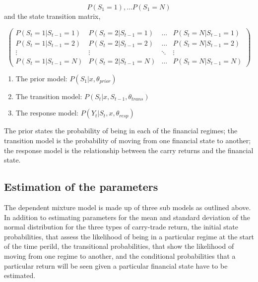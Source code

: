 \documentclass[12pt, a4paper, oneside]{article} %
\begin{document}
\begin{equation*}
P(S_1 = 1), \dots P(S_1 = N)
\end{equation*}
and the state transition matrix, 

\begin{equation*}
\begin{pmatrix}
P(S_t = 1|S_{t-1}=1) & P(S_t = 2|S_{t-1}=1) & \dots & P(S_t = N|S_{t-1}=1)\\
P(S_t = 1|S_{t-1}=2) & P(S_t = 2|S_{t-1}=2) & \dots & P(S_t = N|S_{t-1}=2)\\
\vdots & \vdots & \ddots & \vdots \\
P(S_t = 1|S_{t-1}=N) & P(S_t = 2|S_{t-1}=N) & \dots & P(S_t = N|S_{t-1}=N)
\end{pmatrix}
\end{equation*}

\begin{enumerate}
\item The prior model: $P(S_1|x, \theta_{prior})$
\item The transition model: $P(S_t|x, S_{t-1}, \theta_{trans})$
\item The response model: $P(Y_t| S_t, x, \theta_{resp})$
\end{enumerate}
 
The prior states the probability of being in each of the financial regimes; the transition model is the probability of moving from one financial state to another; the response model is the relationship between the carry returns and the financial state.  



\subsection{Estimation of the parameters}
The dependent mixture model is made up of three sub models as outlined above. 
In addition to estimating parameters for the mean and standard deviation  of the normal distribution for the three types of carry-trade return, the initial state probabilities, that assess the likelihood of being in a particular regime at the start of the time perild, the transitional probabilities, that show the likelihood of moving from one regime to another, and the conditional probabilities that a particular return will be seen given a particular financial state have to be estimated.  
\end{document}
